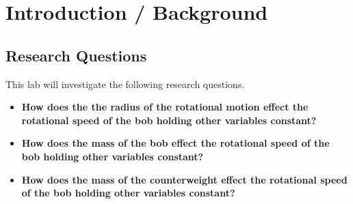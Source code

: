 \documentclass{lab}
\begin{document}
        \section*{Introduction / Background}

	\subsection*{Research Questions}
	This lab will investigate the following research questions.
        \begin{itemize}
                \vspace{-0.5cm}
                \itemsep-3pt
                \item \textbf{How does the the radius of the rotational motion effect the rotational speed of the bob holding other variables constant?}
                \item \textbf{How does the mass of the bob effect the rotational speed of the bob holding other variables constant?}
                \item \textbf{How does the mass of the counterweight effect the rotational speed of the bob holding other variables constant?}
        \end{itemize}

\end{document}

